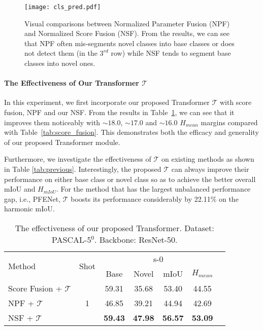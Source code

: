 \documentclass[journal]{IEEEtran}
\begin{document}
\begin{figure}[t]
    \centering
    \texttt{[image: cls\_pred.pdf]}
\caption{Visual comparisons between Normalized Parameter Fusion (NPF) and Normalized Score Fusion (NSF). From the results, we can see that NPF often mis-segments novel classes into base classes or does not detect them (in the $3^{rd}$ row) while NSF tends to segment base classes into novel ones.}
    \label{fig:joint_cls_pred}
\end{figure}

\paragraph{The Effectiveness of Our Transformer $\mathcal{T}$}
In this experiment, we first incorporate our proposed Transformer $\mathcal{T}$ with score fusion, NPF and our NSF. From the results in Table~\ref{tab:joint_cls}, we can see that it improves them noticeably with $\sim 18.0$, $\sim 17.0$ and $\sim 16.0$ $H_{mean}$ margins compared with Table~\ref{tab:score_fusion}. This demonstrates both the efficacy and generality of our proposed Transformer module.

Furthermore, we investigate the effectiveness of $\mathcal{T}$ on existing methods as shown in Table \ref{tab:previous}. Interestingly, the proposed $\mathcal{T}$ can always improve their performance on either base class or novel class so as to achieve the better overall mIoU and $H_{mIoU}$. For the method that has the largest unbalanced performance gap, i.e., PFENet, $\mathcal{T}$ boosts its performance considerably by 22.11\% on the harmonic mIoU.

\begin{table}[ht]
    \centering
    \caption{The effectiveness of our proposed Transformer. Dataset: PASCAL-5$^{0}$. Backbone: ResNet-50.}
\begin{tabular}{l|c|ccccc}
    \hline
         \multirow{2}{*}{Method} & \multirow{2}{*}{Shot} & \multicolumn{4}{c}{s-0} \\
         \cline{3-6}
          & & Base & Novel & mIoU & $H_{mean}$ \\
         \hline
        Score Fusion + $\mathcal{T}$ & \multirow{3}{*}{1} & 59.31 & 35.68 & 53.40 & 44.55 \\
         NPF + $\mathcal{T}$ & & 46.85 & 39.21 & 44.94 & 42.69 \\
         NSF + $\mathcal{T}$ & & \textbf{59.43} & \textbf{47.98} & \textbf{56.57} & \textbf{53.09} \\
    \hline
    \end{tabular}
    \label{tab:joint_cls}
\end{table}
\end{document}
